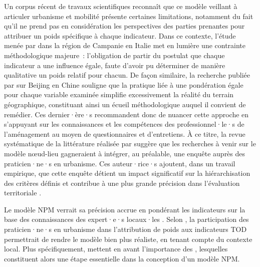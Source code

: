 \begin{refsegment}
Un corpus récent de travaux scientifiques reconnaît que ce modèle veillant à articuler urbanisme et mobilité présente certaines limitations, notamment du fait qu’il ne prend pas en considération les perspectives des parties prenantes pour attribuer un poids spécifique à chaque indicateur. Dans ce contexte, l’étude menée par \textcolor{blue}{\textcite[119]{nigro_land_2019}} dans la région de Campanie en Italie met en lumière une contrainte méthodologique majeure~: l’obligation de partir du postulat que chaque indicateur a une influence égale, faute d’avoir pu déterminer de manière qualitative un poids relatif pour chacun. De façon similaire, la recherche publiée par \textcolor{blue}{\textcite[9]{liao_evaluating_2022}} sur Beijing en Chine souligne que la pratique liée à une pondération égale pour chaque variable examinée simplifie excessivement la réalité du terrain géographique, constituant ainsi un écueil méthodologique auquel il convient de remédier. Ces dernier·ère·s recommandent donc de nuancer cette approche en s’appuyant sur les connaissances et les compétences des professionnel·le·s de l’aménagement au moyen de questionnaires et d’entretiens. À ce titre, la revue systématique de la littérature réalisée par \textcolor{blue}{\textcite[394]{ibrahim_planning_2022}} suggère que les recherches à venir sur le modèle nœud-lieu gagneraient à intégrer, au préalable, une enquête auprès des praticien·ne·s en urbanisme. Ces auteur·rice·s ajoutent, dans un travail empirique, que cette enquête détient un impact significatif sur la hiérarchisation des critères définis et contribue à une plus grande précision dans l’évaluation territoriale \textcolor{blue}{\autocite[254]{ibrahim_measuring_2023}}.%

Le modèle \acrshort{NPM} verrait sa précision accrue en pondérant les indicateurs sur la base des connaissances des expert·e·s locaux·les \textcolor{blue}{\autocites[274]{li_transit_2019}[9]{liao_evaluating_2022}}. Selon \textcolor{blue}{\textcite[3]{lukman_development_2014}}, la participation des praticien·ne·s en urbanisme dans l’attribution de poids aux indicateurs \acrshort{TOD} permettrait de rendre le modèle bien plus réaliste, en tenant compte du contexte local. Plus spécifiquement, \textcolor{blue}{\textcite[10]{lukman_development_2014}} mettent en avant l'importance des , lesquelles constituent alors une étape essentielle dans la conception d’un modèle \acrshort{NPM}.%


\end{refsegment}
